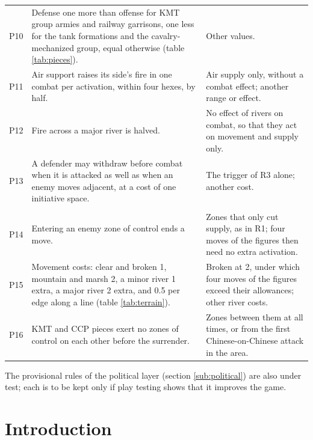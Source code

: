\documentclass[11pt]{article}
\begin{document}
{\begin{longtable}{@{}>{\raggedright\arraybackslash}p{}>{\raggedright\arraybackslash}p{}>{\raggedright\arraybackslash}p{}@{}}
P10 & Defense one more than offense for KMT group armies and railway garrisons, one less for the tank formations and the cavalry-mechanized group, equal otherwise (table \ref{tab:pieces}). & Other values. \\
P11 & Air support raises its side's fire in one combat per activation, within four hexes, by half. & Air supply only, without a combat effect; another range or effect. \\
P12 & Fire across a major river is halved. & No effect of rivers on combat, so that they act on movement and supply only. \\
P13 & A defender may withdraw before combat when it is attacked as well as when an enemy moves adjacent, at a cost of one initiative space. & The trigger of R3 alone; another cost. \\
\multicolumn{3}{@{}l}{\textbf{Movement} (sections \ref{sub:terrain} and \ref{sub:move})} \\
P14 & Entering an enemy zone of control ends a move. & Zones that only cut supply, as in R1; four moves of the figures then need no extra activation. \\
P15 & Movement costs: clear and broken 1, mountain and marsh 2, a minor river 1 extra, a major river 2 extra, and 0.5 per edge along a line (table \ref{tab:terrain}). & Broken at 2, under which four moves of the figures exceed their allowances; other river costs. \\
P16 & KMT and CCP pieces exert no zones of control on each other before the surrender. & Zones between them at all times, or from the first Chinese-on-Chinese attack in the area. \\
\end{longtable}
}
The provisional rules of the political layer (section \ref{sub:political}) are also under test; each is to be kept only if play testing shows that it improves the game.
\clearpage

\section{Introduction}\label{sec:intro}
\end{document}
